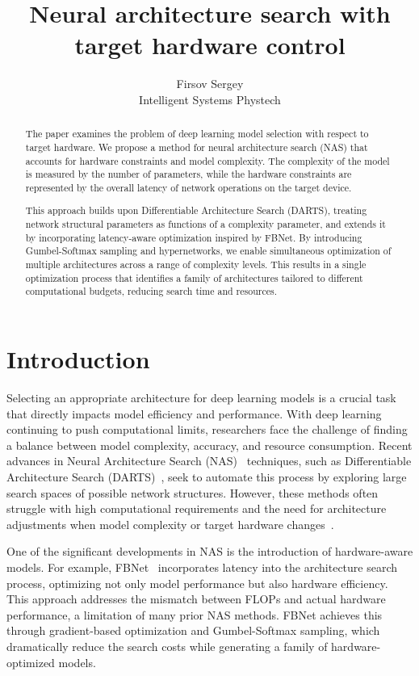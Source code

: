 \documentclass{article}
\title{Neural architecture search with target hardware control}
\author{Firsov Sergey\\
        Intelligent Systems Phystech}
\begin{document}
\maketitle

\begin{abstract}
The paper examines the problem of deep learning model selection with respect to target hardware. We propose a method for neural architecture search (NAS) that accounts for hardware constraints and model complexity. The complexity of the model is measured by the number of parameters, while the hardware constraints are represented by the overall latency of network operations on the target device. 

This approach builds upon Differentiable Architecture Search (DARTS), treating network structural parameters as functions of a complexity parameter, and extends it by incorporating latency-aware optimization inspired by FBNet. By introducing Gumbel-Softmax sampling and hypernetworks, we enable simultaneous optimization of multiple architectures across a range of complexity levels. This results in a single optimization process that identifies a family of architectures tailored to different computational budgets, reducing search time and resources.
\end{abstract}

\section{Introduction}

Selecting an appropriate architecture for deep learning models is a crucial task that directly impacts model efficiency and performance. With deep learning continuing to push computational limits, researchers face the challenge of finding a balance between model complexity, accuracy, and resource consumption. Recent advances in Neural Architecture Search (NAS)~\cite{nas} techniques, such as Differentiable Architecture Search (DARTS)~\cite{liu2019darts}, seek to automate this process by exploring large search spaces of possible network structures. However, these methods often struggle with high computational requirements and the need for architecture adjustments when model complexity or target hardware changes~\cite{yakovlev2021neural}. %

One of the significant developments in NAS is the introduction of hardware-aware models. For example, FBNet~\cite{Wu_2019_CVPR} incorporates latency into the architecture search process, optimizing not only model performance but also hardware efficiency. This approach addresses the mismatch between FLOPs and actual hardware performance, a limitation of many prior NAS methods. FBNet achieves this through gradient-based optimization and Gumbel-Softmax sampling, which dramatically reduce the search costs while generating a family of hardware-optimized models.
\end{document}
